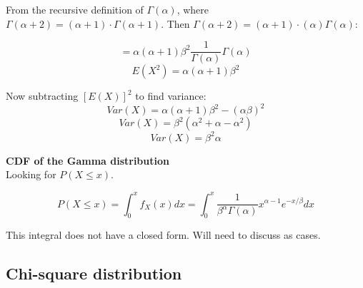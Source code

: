From the recursive definition of $\Gamma(\alpha)$, where $\Gamma (\alpha + 2) = (\alpha + 1) \cdot \Gamma (\alpha + 1)$. Then $\Gamma (\alpha + 2) = (\alpha + 1) \cdot (\alpha) \Gamma (\alpha)$:

$$= \alpha (\alpha + 1) \beta ^2 \frac{1}{\Gamma (\alpha)} \Gamma (\alpha)$$
$$E(X^2) = \alpha (\alpha + 1) \beta ^2$$

Now subtracting $[E(X)]^2$ to find variance:
$$Var(X) = \alpha (\alpha + 1) \beta^2 - (\alpha \beta )^2$$
$$Var(X) = \beta^2(\alpha^2 + \alpha - \alpha^2) $$
$$Var(X) = \beta^2 \alpha$$





\textbf{CDF of the Gamma distribution}\\

Looking for $P(X \le x)$. 

$$P(X \le x) = \int_{0}^{x} f_X (x) dx = \int_{0}^{x} \frac{1}{\beta ^ \alpha \Gamma(\alpha)} x^{\alpha - 1} e^{-x / \beta} dx$$

This integral does not have a closed form. Will need to discuss as cases.

\subsection{Chi-square distribution}

